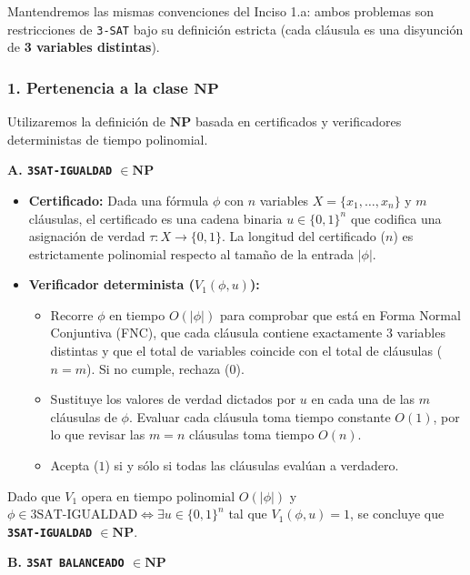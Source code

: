 Mantendremos las mismas convenciones del Inciso 1.a: ambos problemas son restricciones de \texttt{3-SAT} bajo su definición estricta (cada cláusula es una disyunción de \textbf{3 variables distintas}).

\subsubsection*{1. Pertenencia a la clase $\mathbf{NP}$}

Utilizaremos la definición de $\mathbf{NP}$ basada en certificados y verificadores deterministas de tiempo polinomial.

\vspace{0.3cm}
\noindent\textbf{A. \texttt{3SAT-IGUALDAD} $\in \mathbf{NP}$}

\begin{itemize}[leftmargin=*]
    \item \textbf{Certificado:} Dada una fórmula $\phi$ con $n$ variables $X = \{x_1, \dots, x_n\}$ y $m$ cláusulas, el certificado es una cadena binaria $u \in \{0, 1\}^n$ que codifica una asignación de verdad $\tau: X \to \{0, 1\}$. La longitud del certificado ($n$) es estrictamente polinomial respecto al tamaño de la entrada $|\phi|$.

    \item \textbf{Verificador determinista ($V_1(\phi, u)$):}
    \begin{itemize}[leftmargin=*]
        \item Recorre $\phi$ en tiempo $O(|\phi|)$ para comprobar que está en Forma Normal Conjuntiva (FNC), que cada cláusula contiene exactamente $3$ variables distintas y que el total de variables coincide con el total de cláusulas ($n = m$). Si no cumple, rechaza ($0$).
        \item Sustituye los valores de verdad dictados por $u$ en cada una de las $m$ cláusulas de $\phi$. Evaluar cada cláusula toma tiempo constante $O(1)$, por lo que revisar las $m = n$ cláusulas toma tiempo $O(n)$.
        \item Acepta ($1$) si y sólo si todas las cláusulas evalúan a verdadero.
    \end{itemize}
\end{itemize}

Dado que $V_1$ opera en tiempo polinomial $O(|\phi|)$ y $\phi \in \text{3SAT-IGUALDAD} \iff \exists u \in \{0, 1\}^n$ tal que $V_1(\phi, u) = 1$, se concluye que \textbf{\texttt{3SAT-IGUALDAD} $\in \mathbf{NP}$}.

\vspace{0.3cm}
\noindent\textbf{B. \texttt{3SAT BALANCEADO} $\in \mathbf{NP}$}

